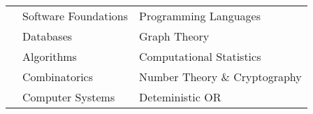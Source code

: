 \begin{tabular}{l l l} \\
& Software Foundations & Programming Languages \\
& Databases &  Graph Theory \\
& Algorithms & Computational Statistics \\
& Combinatorics &  Number Theory \& Cryptography \\
& Computer Systems &  Deteministic OR \\
\end{tabular}
